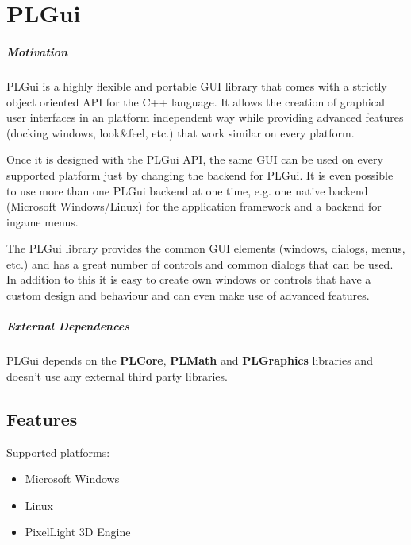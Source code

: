 \chapter{PLGui}


\paragraph{Motivation}
PLGui is a highly flexible and portable \ac{GUI} library that comes with a strictly object oriented \ac{API} for the C++ language. It allows the creation of graphical user interfaces in an platform independent way while providing advanced features (docking windows, look\&feel, etc.) that work similar on every platform.

Once it is designed with the PLGui \ac{API}, the same \ac{GUI} can be used on every supported platform just by changing the backend for PLGui. It is even possible to use more than one PLGui backend at one time, e.g. one native backend (Microsoft Windows/Linux) for the application framework and a backend for ingame menus.

The PLGui library provides the common \ac{GUI} elements (windows, dialogs, menus, etc.) and has a great number of controls and common dialogs that can be used. In addition to this it is easy to create own windows or controls that have a custom design and behaviour and can even make use of advanced features.


\paragraph{External Dependences}
PLGui depends on the \textbf{PLCore}, \textbf{PLMath} and \textbf{PLGraphics} libraries and doesn't use any external third party libraries.




\section{Features}
Supported platforms:
\begin{itemize}
\item Microsoft Windows
\item Linux
\item PixelLight 3D Engine
\end{itemize}
